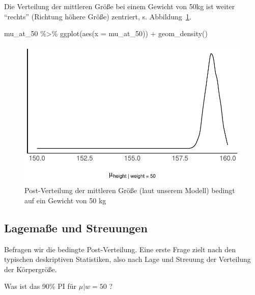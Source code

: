 \documentclass[
  a4paper,
  DIV=11]{scrreprt}
\newenvironment{Shaded}{\begin{snugshade}}{\end{snugshade}}
\newcommand{\AttributeTok}[1]{\textcolor[rgb]{0.40,0.45,0.13}{#1}}
\newcommand{\FunctionTok}[1]{\textcolor[rgb]{0.28,0.35,0.67}{#1}}
\newcommand{\NormalTok}[1]{\textcolor[rgb]{0.00,0.23,0.31}{#1}}
\newcommand{\SpecialCharTok}[1]{\textcolor[rgb]{0.37,0.37,0.37}{#1}}
\theoremstyle{definition}
\theoremstyle{remark}
\begin{document}
Die Verteilung der mittleren Größe bei einem Gewicht von 50kg ist weiter
``rechts'' (Richtung höhere Größe) zentriert, s.
Abbildung~\ref{fig-mu-at-50}.

\begin{Shaded}
\begin{Highlighting}[]
\NormalTok{mu\_at\_50 }\SpecialCharTok{\%\textgreater{}\%} 
  \FunctionTok{ggplot}\NormalTok{(}\FunctionTok{aes}\NormalTok{(}\AttributeTok{x =}\NormalTok{ mu\_at\_50)) }\SpecialCharTok{+}
  \FunctionTok{geom\_density}\NormalTok{()}
\end{Highlighting}
\end{Shaded}

\begin{figure}

{\centering \includegraphics{./lineare-modelle_files/figure-pdf/fig-mu-at-50-1.pdf}

}

\caption{\label{fig-mu-at-50}Post-Verteilung der mittleren Größe (laut
unserem Modell) bedingt auf ein Gewicht von 50 kg}

\end{figure}

\hypertarget{lagemauxdfe-und-streuungen}{%
\subsection{Lagemaße und Streuungen}\label{lagemauxdfe-und-streuungen}}

Befragen wir die bedingte Post-Verteilung. Eine erste Frage zielt nach
den typischen deskriptiven Statistiken, also nach Lage und Streuung der
Verteilung der Körpergröße.

Was ist das 90\% PI für \(\mu|w=50\) ?
\end{document}

